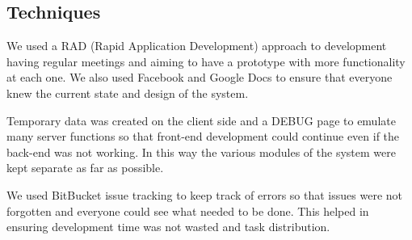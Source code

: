 \subsection{Techniques}
We used a RAD (Rapid Application Development) approach to development having regular meetings and aiming to have a prototype with more functionality at each one. We also used Facebook and Google Docs to ensure that everyone knew the current state and design of the system.

Temporary data was created on the client side and a DEBUG page to emulate many server functions so that front-end development could continue even if the back-end was not working. In this way the various modules of the system were kept separate as far as possible.

We used BitBucket issue tracking to keep track of errors so that issues were not forgotten and everyone could see what needed to be done. This helped in ensuring development time was not wasted and task distribution.